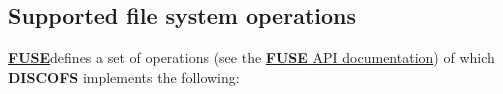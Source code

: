 \documentclass[a4paper]{article}
\newcommand{\software}[1]{\textsc{\textbf{#1}}\xspace}
\newcommand{\discofs}{\software{DISCOFS}}
\newcommand{\fuse}{\href{http://fuse.sourceforge.net/}{\software{FUSE}\xspace}}
\begin{document}

\pagebreak
\clearpage
{}

\begin{appendix} %
\section{Supported file system operations} %
\label{appendix:fsops}
\fuse defines a set of operations (see the
\href{http://fuse.sourceforge.net/doxygen/structfuse__operations.html}{\fuse
API documentation}) of which \discofs implements the following:

\newcommand{\fsop}[3]{ %
\item \label{fsop:#1} \texttt{#1}
	\ifthenelse{\equal{#2}{-}}
		{(No corresponding \textsc{POSIX} function)}
		{(\textsc{POSIX}: \texttt{\ifthenelse{\equal{#2}{}}{#1}{#2}})}
		\\
	#3 \\
}
\begin{itemize}\itemsep0pt

\end{itemize}

\end{appendix}%
\end{document}
